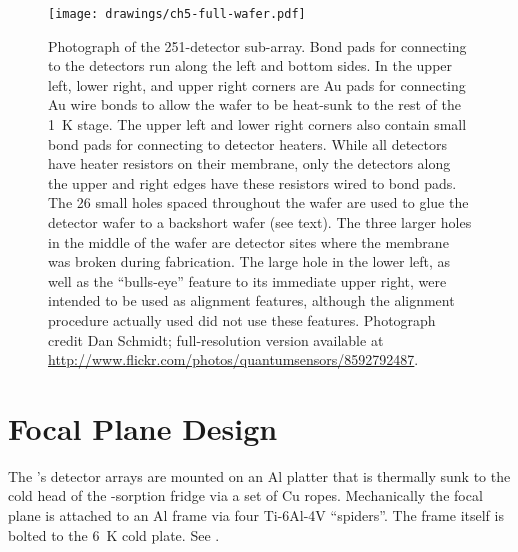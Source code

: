 \begin{figure}
\centering
\texttt{[image: drawings/ch5-full-wafer.pdf]}
\caption[Photograph of 251-detector sub-array]{
  Photograph of the 251-detector sub-array.
  Bond pads for connecting to the detectors run along the left and bottom sides.
  In the upper left, lower right, and upper right corners are Au pads for connecting Au wire bonds to allow the wafer to be heat-sunk to the rest of the \SI{1}{\K} stage.
  The upper left and lower right corners also contain small bond pads for connecting to detector heaters.
  While all detectors have heater resistors on their membrane, only the detectors along the upper and right edges have these resistors wired to bond pads.
  The 26 small holes spaced throughout the wafer are used to glue the detector wafer to a backshort wafer (see text).
  The three larger holes in the middle of the wafer are detector sites where the membrane was broken during fabrication.
  The large hole in the lower left, as well as the ``bulls-eye'' feature to its immediate upper right, were intended to be used as alignment features, although the alignment procedure actually used did not use these features.
  Photograph credit Dan Schmidt; full-resolution version available at \protect\url{http://www.flickr.com/photos/quantumsensors/8592792487}.
}
\label{fig:ch5-full-wafer}
\end{figure}

\section{Focal Plane Design} \label{sec:ch5-focal-plane}

The \Imager's detector arrays are mounted on an Al platter that is thermally sunk to the cold head of the -sorption fridge via a set of Cu ropes.
Mechanically the focal plane is attached to an Al frame via four Ti-6Al-4V ``spiders''.
The frame itself is bolted to the \SI{6}{\K} cold plate.
See .

